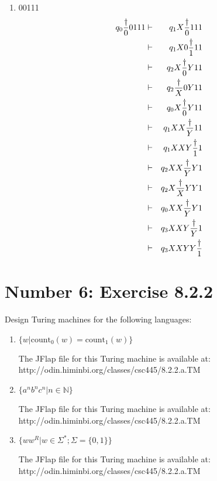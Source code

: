 \documentclass[12pt,a4paper,twoside]{article}  %
\begin{document}
\begin{enumerate}
\item 00111
\begin{eqnarray}
q_0 {\dagger\over{0}}0111 &\vdash& q_1 X{\dagger\over{0}}111 \nonumber\\
                        &\vdash& q_1 X0{\dagger\over{1}}11 \nonumber\\
                        &\vdash& q_2 X{\dagger\over{0}}Y11 \nonumber\\
                        &\vdash& q_2 {\dagger\over{X}}0Y11 \nonumber\\
                        &\vdash& q_0 X{\dagger\over{0}}Y11 \nonumber\\
                        &\vdash& q_1 XX{\dagger\over{Y}}11 \nonumber\\
                        &\vdash& q_1 XXY{\dagger\over{1}}1 \nonumber\\
                        &\vdash& q_2 XX{\dagger\over{Y}}Y1 \nonumber\\
                        &\vdash& q_2 X{\dagger\over{X}}YY1 \nonumber\\
                        &\vdash& q_0 XX{\dagger\over{Y}}Y1 \nonumber\\
                        &\vdash& q_3 XXY{\dagger\over{Y}}1 \nonumber\\
                        &\vdash& q_3 XXYY{\dagger\over{1}} \nonumber
\end{eqnarray}

\end{enumerate}

\section{Number 6: Exercise 8.2.2}

Design Turing machines for the following languages:

\begin{enumerate}

\item $\{w | \textrm{count}_0(w) =\textrm{count}_1(w)\}$

The JFlap file for this Turing machine is available at: \\
 {http://odin.himinbi.org/classes/csc445/8.2.2.a.TM}

\item $\{a^nb^nc^n | n \in \mathbb{N}\}$

The JFlap file for this Turing machine is available at: \\
 {http://odin.himinbi.org/classes/csc445/8.2.2.a.TM}

\item $\{ww^R | w \in \Sigma^*; \Sigma = \{0,1\}\}$

The JFlap file for this Turing machine is available at: \\
 {http://odin.himinbi.org/classes/csc445/8.2.2.a.TM}

\end{enumerate}
\end{document}
